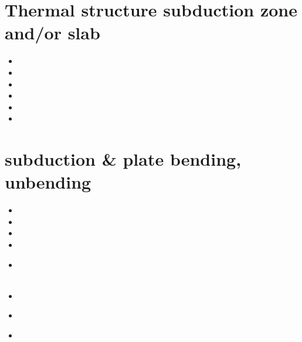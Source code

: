 \section{Thermal structure subduction zone and/or slab}

\begin{small}
\begin{itemize}
\item[1973] 
\item[2018]  
\item[2004] 
\item[2022] 
\item[2023]  
\item[2024]  
\end{itemize}
\end{small}













\section{subduction \& plate bending, unbending}

\begin{small}
\begin{itemize}
\item[\nineteenninetynine]
\item[\twothousandsix]
\item[\twothousandeight]
\item[\twothousandnine]
\item[\twothousandtwelve]
 \\
 \\
\item[\twothousandfourteen]
\item[\twothousandnineteen]
 \\ 
\item[\twothousandtwentyone]
\end{itemize}
\end{small}






